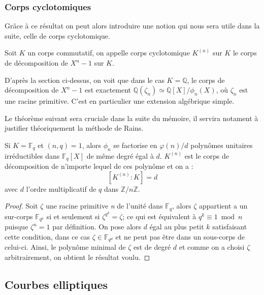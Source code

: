 \documentclass[a4paper]{article} %
\numberwithin{equation}{section}
\newcommand\nroot[1]{\textit{#1}\up{\textit{ième}}}
\newcommand\zmodn[1]{\mathbb{Z}/#1\mathbb{Z}}
\newcommand\GF[1]{\mathbb{F}_{#1}}
\begin{document}
\subsubsection{Corps cyclotomiques}

Grâce à ce résultat on peut alors introduire une notion qui nous sera utile dans la suite, celle de corps cyclotomique.

\begin{defn}
Soit $K$ un corps commutatif, on appelle corps cyclotomique $K^{(n)}$ sur $K$ le corps de décomposition de $X^n - 1$ sur $K$.
\end{defn}

\begin{rem}
D'après la section ci-dessus, on voit que dans le cas $K = \mathbb{Q}$, le corps de décomposition de $X^n - 1$ est exactement $\mathbb{Q}(\zeta_n) \simeq \mathbb{Q}[X]/\phi_n(X)$, où $\zeta_n$ est une racine primitive. C'est en particulier une extension algébrique simple.
\end{rem}

Le théorème suivant sera cruciale dans la suite du mémoire, il servira notament à justifier théoriquement la méthode de Rains.

\begin{thm}
\label{polycycldecomp}
Si $K = \GF{q}$ et $(n,q) = 1$, alors $\phi_n$ se factorise en $\varphi(n)/d$ polynômes unitaires irréductibles dans $\GF{q}[X]$ de même degré égal à $d$. $K^{(n)}$ est le corps de décomposition de n'importe lequel de ces polynôme et on a :
\[[K^{(n)}:K] = d\]
avec $d$ l'ordre multiplicatif de $q$ dans $\zmodn{n}$.
\end{thm}
\begin{proof}
 Soit $\zeta$ une racine primitive \nroot{n} de l'unité dans $\GF{q}$, alors $\zeta$ appartient a un sur-corps $\GF{q^k}$ si et seulement si $\zeta^{q^k} = \zeta$; ce qui est équivalent à $q^k \equiv 1 \bmod n$ puisque $\zeta^n = 1$ par définition. On pose alors $d$ égal au plus petit $k$ satisfaisant cette condition, dans ce cas $\zeta\in\GF{q^d}$ et ne peut pas être dans un sous-corps de celui-ci. Ainsi, le polynôme minimal de $\zeta$ est de degré $d$ et comme on a choisi $\zeta$ arbitrairement, on obtient le résultat voulu.
\end{proof}




\subsection{Courbes elliptiques}
\end{document}
